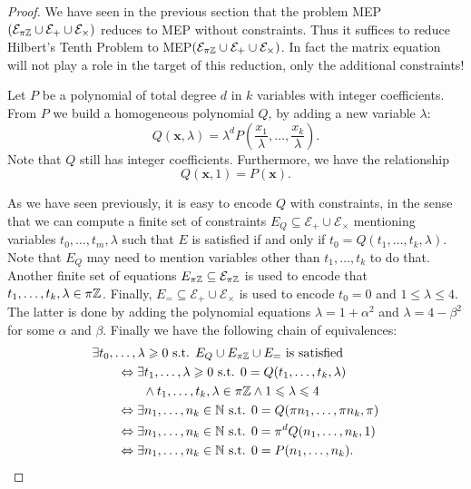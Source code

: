 \begin{proof}
  We have seen in the previous section that the problem
  MEP$(\mathcal{E}_{\pi\mathbb{Z}}\cup\mathcal{E}_{+}\cup\mathcal{E}_{\times})$
  reduces to MEP without constraints.  Thus it suffices to reduce
  Hilbert's Tenth Problem to
  MEP$(\mathcal{E}_{\pi\mathbb{Z}}\cup\mathcal{E}_{+}\cup\mathcal{E}_{\times})$.
  In fact the matrix equation will not play a role in the
  target of this reduction, only the additional constraints!

  Let $P$ be a polynomial of total degree $d$ in $k$ variables with
  integer coefficients. From $P$ we build a homogeneous polynomial $Q$, by
  adding a new variable $\lambda$:
  \[Q(\mathbf{x},\lambda)=\lambda^{d}P\left(\frac{x_1}{\lambda},\ldots,
    \frac{x_k}{\lambda}\right).\]
  Note that $Q$ still has integer coefficients. Furthermore, we have the relationship
\[Q(\mathbf{x},1)=P(\mathbf{x}).\]

As we have seen previously, it is easy to encode $Q$ with constraints,
in the sense that we can compute a finite set of constraints
$E_Q \subseteq \mathcal{E}_{+}\cup\mathcal{E}_{\times}$ mentioning variables
$t_0,\ldots,t_m,\lambda$
such that $E$ is
satisfied if and only if $t_0=Q(t_1,\ldots,t_k,\lambda)$. Note that
$E_Q$ may need to mention variables other
than $t_1,\ldots,t_k$ to do that.  Another
finite set of equations
$E_{\pi\mathbb{Z}}\subseteq\mathcal{E}_{\pi\mathbb{Z}}$ is used to
encode that $t_1,\ldots,t_k,\lambda\in\pi\mathbb{Z}$. Finally,
$E_{=}\subseteq\mathcal{E}_{+}\cup\mathcal{E}_{\times}$ is used to
encode $t_{0}=0$ and $1\leqslant \lambda\leqslant4$.  The
latter is done by adding the polynomial equations $\lambda=1+\alpha^2$ and
$\lambda=4-\beta^2$ for some $\alpha$ and $\beta$. Finally we have the
following chain of equivalences:
\begin{align*}
&\exists t_0,\ldots,\lambda\geqslant0\text{ s.t. }E_Q\cup E_{\pi\mathbb{Z}}\cup E_{=}\text{ is satisfied }\\
&\qquad\Leftrightarrow\exists t_1,\ldots,\lambda\geqslant0\text{ s.t. } 0=Q(t_1,\ldots,t_k,\lambda)\\
    &\qquad\qquad\wedge t_1,\ldots,t_k,\lambda\in\pi\mathbb{Z}\wedge 1\leqslant\lambda\leqslant4\\
&\qquad\Leftrightarrow\exists n_1,\ldots,n_k\in\mathbb{N}\text{ s.t. } 0=Q(\pi n_1,\ldots,\pi n_k,\pi)\\
&\qquad\Leftrightarrow\exists n_1,\ldots,n_k\in\mathbb{N}\text{ s.t. } 0=\pi^{d} Q(n_1,\ldots,n_k,1)\\
&\qquad\Leftrightarrow\exists n_1,\ldots,n_k\in\mathbb{N}\text{ s.t. } 0=P(n_1,\ldots,n_k).\\
\end{align*}
\end{proof}
